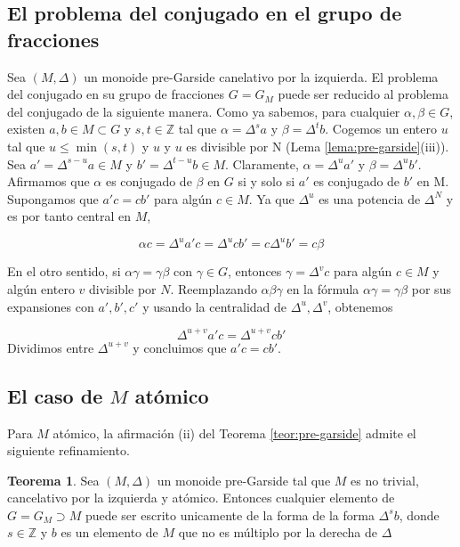\documentclass[12pt]{article}
\theoremstyle{definition}
\newtheorem{teor}{Teorema}[section]
\begin{document}
\subsection{El problema del conjugado en el grupo de fracciones}

Sea $(M,\Delta)$ un monoide pre-Garside canelativo por la izquierda. El problema del conjugado en su grupo de fracciones $G=G_M$ puede ser reducido al problema del conjugado de la siguiente manera. Como ya sabemos, para cualquier $\alpha,\beta\in G$, existen $a,b\in M\subset G$ y $s,t\in\mathbb{Z}$ tal que $\alpha=\Delta^sa$ y $\beta=\Delta^t b$. Cogemos un entero $u$ tal que $u\leq \min(s,t)$ y $u$ y $u$ es divisible por N (Lema \ref{lema:pre-garside}(iii)). Sea $a'=\Delta^{s-u}a\in M$ y $b'=\Delta^{t-u}b\in M$. Claramente, $\alpha=\Delta^ua'$ y $\beta=\Delta^ub'$. Afirmamos que $\alpha$ es conjugado de $\beta$ en $G$ si y solo si $a'$ es conjugado de $b'$ en M. Supongamos que $a'c=cb'$ para algún $c\in M$. Ya que $\Delta^u$ es una potencia de $\Delta^N$ y es por tanto central en $M$,

$$\alpha c=\Delta^u a'c=\Delta^u c b' = c\Delta^u b'=c\beta$$

En el otro sentido, si $\alpha\gamma=\gamma\beta$ con $\gamma\in G$, entonces $\gamma=\Delta^v c$ para algún $c\in M$ y algún entero $v$ divisible por $N$. Reemplazando $\alpha\beta\gamma$ en la fórmula $\alpha\gamma=\gamma\beta$ por sus expansiones con $a',b',c'$ y usando la centralidad de $\Delta^u,\Delta^v$, obtenemos

$$\Delta^{u+v}a'c=\Delta^{u+v}cb'$$
\newline
Dividimos entre $\Delta^{u+v}$ y concluimos que $a'c=cb'$.

\subsection{El caso de $M$ atómico}

Para $M$ atómico, la afirmación (ii) del Teorema \ref{teor:pre-garside} admite el siguiente refinamiento.

\begin{teor}
Sea $(M,\Delta)$ un monoide pre-Garside tal que $M$ es no trivial, cancelativo por la izquierda y atómico. Entonces cualquier elemento de $G=G_M\supset M$ puede ser escrito unicamente de la forma de la forma $\Delta^s b$, donde $s\in\mathbb{Z}$ y $b$ es un elemento de $M$ que no es múltiplo por la derecha de $\Delta$
\label{teor:refi}
\end{teor}
\end{document}
